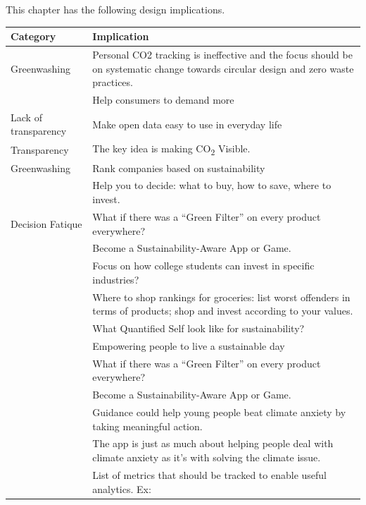 \documentclass[
  letterpaper,
  DIV=11,
  numbers=noendperiod]{scrartcl}
\begin{document}
This chapter has the following design implications.

\begin{longtable}[]{@{}
  >{\raggedright\arraybackslash}p{}
  >{\raggedright\arraybackslash}p{}@{}}
\toprule\noalign{}
\begin{minipage}[b]{\linewidth}\raggedright
Category
\end{minipage} & \begin{minipage}[b]{\linewidth}\raggedright
Implication
\end{minipage} \\
\midrule\noalign{}
\endhead
\bottomrule\noalign{}
\endlastfoot
Greenwashing & Personal CO2 tracking is ineffective and the focus should
be on systematic change towards circular design and zero waste
practices. \\
& Help consumers to demand more \\
Lack of transparency & Make open data easy to use in everyday life \\
Transparency & The key idea is making CO\textsubscript{2} Visible. \\
Greenwashing & Rank companies based on sustainability \\
& Help you to decide: what to buy, how to save, where to invest. \\
Decision Fatique & What if there was a ``Green Filter'' on every product
everywhere? \\
& Become a Sustainability-Aware App or Game. \\
& Focus on how college students can invest in specific industries? \\
& Where to shop rankings for groceries: list worst offenders in terms of
products; shop and invest according to your values. \\
& What Quantified Self look like for sustainability? \\
& Empowering people to live a sustainable day \\
& What if there was a ``Green Filter'' on every product everywhere? \\
& Become a Sustainability-Aware App or Game. \\
& Guidance could help young people beat climate anxiety by taking
meaningful action. \\
& The app is just as much about helping people deal with climate anxiety
as it's with solving the climate issue. \\
& List of metrics that should be tracked to enable useful analytics. Ex:

\end{longtable}
\end{document}
